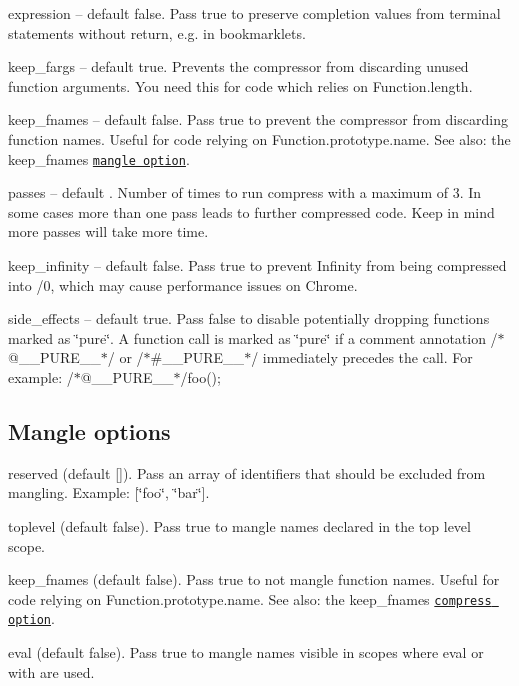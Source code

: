 \begin{DoxyItemize}
\item {\ttfamily expression} -- default {\ttfamily false}. Pass {\ttfamily true} to preserve completion values from terminal statements without {\ttfamily return}, e.\+g. in bookmarklets.
\item {\ttfamily keep\+\_\+fargs} -- default {\ttfamily true}. Prevents the compressor from discarding unused function arguments. You need this for code which relies on {\ttfamily Function.\+length}.
\item {\ttfamily keep\+\_\+fnames} -- default {\ttfamily false}. Pass {\ttfamily true} to prevent the compressor from discarding function names. Useful for code relying on {\ttfamily Function.\+prototype.\+name}. See also\+: the {\ttfamily keep\+\_\+fnames} \href{#mangle}{\tt mangle option}.
\item {\ttfamily passes} -- default {}. Number of times to run compress with a maximum of 3. In some cases more than one pass leads to further compressed code. Keep in mind more passes will take more time.
\item {\ttfamily keep\+\_\+infinity} -- default {\ttfamily false}. Pass {\ttfamily true} to prevent {\ttfamily Infinity} from being compressed into {/0}, which may cause performance issues on Chrome.
\item {\ttfamily side\+\_\+effects} -- default {\ttfamily true}. Pass {\ttfamily false} to disable potentially dropping functions marked as \char`\"{}pure\char`\"{}. A function call is marked as \char`\"{}pure\char`\"{} if a comment annotation {\ttfamily /$\ast$@\+\_\+\+\_\+\+P\+U\+R\+E\+\_\+\+\_\+$\ast$/} or {\ttfamily /$\ast$\#\+\_\+\+\_\+\+P\+U\+R\+E\+\_\+\+\_\+$\ast$/} immediately precedes the call. For example\+: {\ttfamily /$\ast$@\+\_\+\+\_\+\+P\+U\+R\+E\+\_\+\+\_\+$\ast$/foo();}
\end{DoxyItemize}

\subsection*{Mangle options}


\begin{DoxyItemize}
\item {\ttfamily reserved} (default {\ttfamily \mbox{[}\mbox{]}}). Pass an array of identifiers that should be excluded from mangling. Example\+: {\ttfamily \mbox{[}\char`\"{}foo\char`\"{}, \char`\"{}bar\char`\"{}\mbox{]}}.
\item {\ttfamily toplevel} (default {\ttfamily false}). Pass {\ttfamily true} to mangle names declared in the top level scope.
\item {\ttfamily keep\+\_\+fnames} (default {\ttfamily false}). Pass {\ttfamily true} to not mangle function names. Useful for code relying on {\ttfamily Function.\+prototype.\+name}. See also\+: the {\ttfamily keep\+\_\+fnames} \href{#compress-options}{\tt compress option}.
\item {\ttfamily eval} (default {\ttfamily false}). Pass {\ttfamily true} to mangle names visible in scopes where {\ttfamily eval} or {\ttfamily with} are used.
\end{DoxyItemize}

